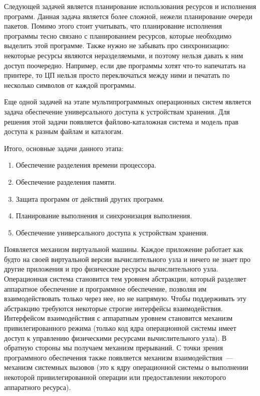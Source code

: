 Следующей задачей является планирование использования ресурсов и исполнения
программ. Данная задача является более сложной, нежели планирование очереди
пакетов. Помимо этого стоит учитывать, что планирование исполнения программы
тесно связано с планированием ресурсов, которые необходимо выделить этой
программе. Также нужно не забывать про синхронизацию: некоторые ресурсы являются
неразделяемыми, и поэтому нельзя давать к ним доступ поочередно. Например, если
две программы хотят что-то напечатать на принтере, то ЦП нельзя просто
переключаться между ними и печатать по несколько символов от каждой программы.

Еще одной задачей на этапе мультипрограммных операционных систем является задача
обеспечение универсального доступа к устройствам хранения. Для решения этой
задачи появляется файлово-каталожная система и модель прав доступа к разным
файлам и каталогам.

Итого, основные задачи данного этапа:

\begin{enumerate}
\item
  Обеспечение разделения времени процессора.

\item
  Обеспечение разделения памяти.

\item
  Защита программ от действий других программ.

\item
  Планирование выполнения и синхронизация выполнения.

\item
  Обеспечение универсального доступа к устройствам хранения.
\end{enumerate}

Появляется механизм виртуальной машины. Каждое приложение работает как будто на
своей виртуальной версии вычислительного узла и ничего не знает про другие
приложения и про физические ресурсы вычислительного узла. Операционная система
становится тем уровнем абстракции, который разделяет аппаратное обеспечение и
программное обеспечение, позволяя им взаимодействовать только через нее, но не
напрямую. Чтобы поддерживать эту абстракцию требуются некоторые строгие
интерфейсы взаимодействия. Интерфейсом взаимодействия с аппаратным уровнем
становится механизм привилегированного режима (только код ядра операционной
системы имеет доступ к управлению физическими ресурсами вычислительного узла).
В обратную стороны мы получаем механизм прерываний. С точки зрения программного
обеспечения также появляется механизм взаимодействия~--- механизм системных
вызовов (это  к ядру операционной системы о выполнении некоторой
привилегированной операции или предоставлении некоторого аппаратного ресурса).

